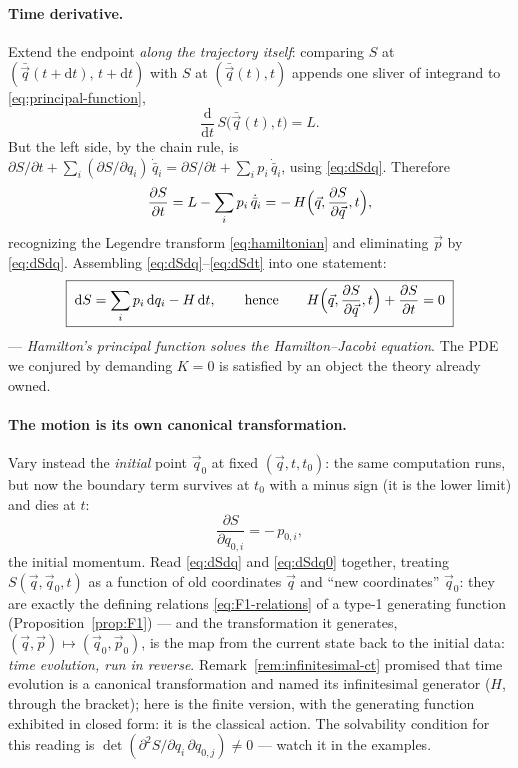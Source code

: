 \documentclass[11pt]{article}
\theoremstyle{plain}
\theoremstyle{definition}
\theoremstyle{remark}
\newcommand{\dd}{\mathrm{d}}
\newcommand{\pd}[2]{\frac{\partial #1}{\partial #2}}
\newcommand{\tot}[2]{\frac{\dd #1}{\dd #2}}
\newcommand{\vq}{\vec{q}}
\newcommand{\vp}{\vec{p}}
\begin{document}
\paragraph{Time derivative.}
Extend the endpoint \emph{along the trajectory itself}: comparing
$S$ at $(\bar\vq(t + \dd t),\, t + \dd t)$ with $S$ at
$(\bar\vq(t), t)$ appends one sliver of integrand to
\eqref{eq:principal-function},
\begin{equation}
  \tot{}{t}\,S\bigl(\bar\vq(t), t\bigr) = L .
\end{equation}
But the left side, by the chain rule, is
$\partial S/\partial t + \sum_i (\partial S/\partial q_i)\,
\dot{\bar q}_i = \partial S/\partial t + \sum_i p_i\,\dot{\bar q}_i$,
using \eqref{eq:dSdq}. Therefore
\begin{equation}
  \pd{S}{t}
  = L - \sum_i p_i\,\dot{\bar q}_i
  = -\,H\Bigl(\vq, \pd{S}{\vq}, t\Bigr),
  \label{eq:dSdt}
\end{equation}
recognizing the Legendre transform \eqref{eq:hamiltonian} and
eliminating $\vp$ by \eqref{eq:dSdq}. Assembling
\eqref{eq:dSdq}--\eqref{eq:dSdt} into one statement:
\begin{equation}
  \boxed{\;
  \dd S = \sum_i p_i\,\dd q_i - H\,\dd t,
  \qquad\text{hence}\qquad
  H\Bigl(\vq, \pd{S}{\vq}, t\Bigr) + \pd{S}{t} = 0
  \;}
\end{equation}
--- \emph{Hamilton's principal function solves the Hamilton--Jacobi
equation}. The PDE we conjured by demanding $K = 0$ is satisfied by an
object the theory already owned.

\paragraph{The motion is its own canonical transformation.}
Vary instead the \emph{initial} point $\vq_0$ at fixed
$(\vq, t, t_0)$: the same computation runs, but now the boundary term
survives at $t_0$ with a minus sign (it is the lower limit) and dies at
$t$:
\begin{equation}
  \pd{S}{q_{0,i}} = -\,p_{0,i} ,
  \label{eq:dSdq0}
\end{equation}
the initial momentum. Read \eqref{eq:dSdq} and \eqref{eq:dSdq0}
together, treating $S(\vq, \vq_0, t)$ as a function of old coordinates
$\vq$ and ``new coordinates'' $\vq_0$: they are exactly the defining
relations \eqref{eq:F1-relations} of a type-1 generating function
(Proposition~\ref{prop:F1}) --- and the transformation it generates,
$(\vq, \vp) \mapsto (\vq_0, \vp_0)$, is the map from the current state
back to the initial data: \emph{time evolution, run in reverse}.
Remark~\ref{rem:infinitesimal-ct} promised that time evolution is a
canonical transformation and named its infinitesimal generator ($H$,
through the bracket); here is the finite version, with the generating
function exhibited in closed form: it is the classical action. The
solvability condition for this reading is
$\det(\partial^2 S/\partial q_i\,\partial q_{0,j}) \ne 0$ ---
watch it in the examples.
\end{document}
